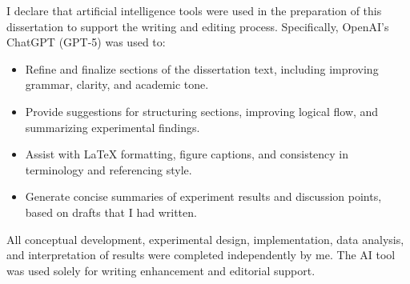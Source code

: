I declare that artificial intelligence tools were used in the preparation of this dissertation to support the writing and editing process. Specifically, OpenAI’s ChatGPT (GPT-5) was used to:
\begin{itemize}
    \item Refine and finalize sections of the dissertation text, including improving grammar, clarity, and academic tone.
    \item Provide suggestions for structuring sections, improving logical flow, and summarizing experimental findings.
    \item Assist with LaTeX formatting, figure captions, and consistency in terminology and referencing style.
    \item Generate concise summaries of experiment results and discussion points, based on drafts that I had written.
\end{itemize}
All conceptual development, experimental design, implementation, data analysis, and interpretation of results were completed independently by me. The AI tool was used solely for writing enhancement and editorial support.
